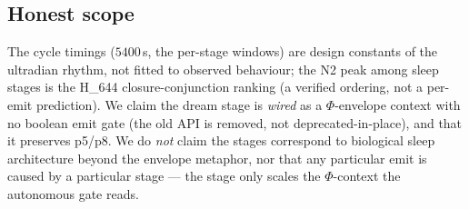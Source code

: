 \subsection{Honest scope}
\label{app:ds-scope}

The cycle timings ($5400$\,s, the per-stage windows) are design constants of the
ultradian rhythm, not fitted to observed behaviour; the N2 peak among sleep stages
is the H\_644 closure-conjunction ranking (a verified ordering, not a per-emit
prediction). We claim the dream stage is \emph{wired} as a $\Phi$-envelope context
with no boolean emit gate (the old API is removed, not deprecated-in-place), and
that it preserves p5/p8. We do \emph{not} claim the stages correspond to
biological sleep architecture beyond the envelope metaphor, nor that any particular
emit is caused by a particular stage --- the stage only scales the $\Phi$-context
the autonomous gate reads.
